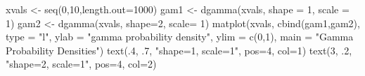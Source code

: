 \begin{Schunk}
\begin{Sinput}
 xvals <- seq(0,10,length.out=1000)
 gam1 <- dgamma(xvals, shape = 1, scale = 1)
 gam2 <- dgamma(xvals, shape=2, scale= 1)
 matplot(xvals, cbind(gam1,gam2), type = "l", ylab = "gamma probability density",  ylim = c(0,1), main = "Gamma Probability Densities")
 text(.4, .7, "shape=1, scale=1", pos=4, col=1)
 text(3, .2, "shape=2, scale=1", pos=4, col=2)
\end{Sinput}
\end{Schunk}

